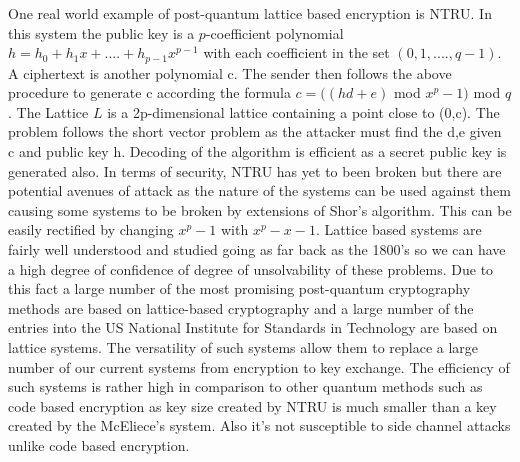 \documentclass[10pt,a4paper]{article}
\begin{document}
\newline
\newline
One real world example of post-quantum lattice based encryption is NTRU. In this system the public key is a \(p\)-coefficient polynomial \( h = h_0 +h_1x+....+h_{p-1}x^{p-1} \) with each coefficient in the set \((0,1,....,q-1)\). A ciphertext is another polynomial c. The sender then follows the above procedure to generate c according the formula \(c =  ((hd + e) \) mod \(x^p-1)\) mod \( q\). The Lattice \(L\) is a 2p-dimensional lattice containing a point close to (0,c). The problem follows the short vector problem as the attacker must find the d,e given c and public key h. Decoding of the algorithm is efficient as a secret public key is generated also.
\newline
In terms of security, NTRU has yet to been broken but there are potential avenues of attack as the nature of the systems can be used against them causing some systems to be broken by extensions of Shor's algorithm. This can be easily rectified by changing \(x^p-1\) with \(x^p-x-1\).
\newline
Lattice based systems are fairly well understood and studied going as far back as the 1800's so we can have a high degree of confidence of degree of unsolvability of these problems. Due to this fact a large number of the most promising post-quantum cryptography methods are based on lattice-based cryptography and a large number of the entries into the US National Institute for Standards in Technology are based on lattice systems. The versatility of such systems allow them to replace a large number of our current systems from encryption to key exchange. The efficiency of such systems is rather high in comparison to other quantum methods such as code based encryption as key size created by NTRU is much smaller than a key created by the McEliece's system. Also it's not susceptible to side channel attacks unlike code based encryption.
\end{document}
